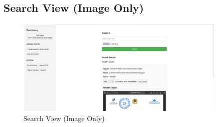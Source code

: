 \subsection{Search View (Image Only)}

\begin{figure}[H]
\centering
  \includegraphics[width=0.9\textwidth]{img/Interfaces/search_image.png}
\caption{Search View (Image Only)}
\label{Search View (Image Only)}      
\end{figure}